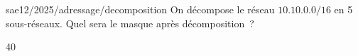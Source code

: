 \begin{question}{sae12/2025/adressage/decomposition}
  On décompose le réseau $10.10.0.0/16$ en 5 sous-réseaux. Quel sera
  le masque après décomposition~?
  \begin{reponses}{4}{0}
  \end{reponses}
\end{question}
